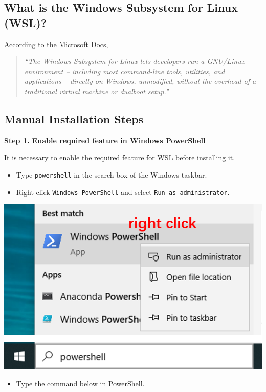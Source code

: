 \documentclass[
]{book}
\providecommand{\tightlist}{%
  \setlength{\itemsep}{0pt}\setlength{\parskip}{0pt}}
\begin{document}
\hypertarget{what-is-the-windows-subsystem-for-linux-wsl}{%
\subsection{What is the Windows Subsystem for Linux (WSL)?}\label{what-is-the-windows-subsystem-for-linux-wsl}}

According to the \href{https://docs.microsoft.com/en-us/windows/wsl/about}{Microsoft Docs},

\begin{quote}
\emph{``The Windows Subsystem for Linux lets developers run a GNU/Linux environment -- including most command-line tools, utilities, and applications -- directly on Windows, unmodified, without the overhead of a traditional virtual machine or dualboot setup.''}
\end{quote}

\hypertarget{manual-installation-steps}{%
\subsection{Manual Installation Steps}\label{manual-installation-steps}}

\textbf{Step 1. Enable required feature in Windows PowerShell}

It is necessary to enable the required feature for WSL before installing it.

\begin{itemize}
\tightlist
\item
  Type \texttt{powershell} in the search box of the Windows taskbar.
\item
  Right click \texttt{Windows\ PowerShell} and select \texttt{Run\ as\ administrator}.
\end{itemize}

\begin{center}\includegraphics[width=0.45\linewidth]{./images/wsl_open_powershell} \end{center}

\begin{itemize}
\tightlist
\item
  Type the command below in PowerShell.
\end{itemize}
\end{document}
